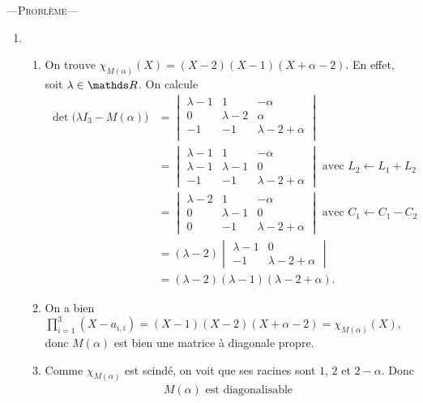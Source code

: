 \documentclass[a4paper]{article}
\begin{document}
	\begin{center}
		\LARGE ---\quad\textsc{Problème}\quad---
	\end{center}
	\begin{enumerate}
		\item
			\begin{enumerate}
				\item On trouve $\chi_{M(\alpha)}(X) = (X - 2)(X - 1)(X + \alpha - 2)$. En effet, soit $\lambda \in \R$. On calcule
					\begin{align*}
						\det\big(\lambda I_3 - M(\alpha)\big)
						&= 
						\begin{vmatrix}
							\lambda - 1 & 1 & -\alpha\\
							0 & \lambda - 2 & \alpha\\
							-1 & -1 & \lambda - 2 + \alpha\\
						\end{vmatrix}\\
						&= 
						\begin{vmatrix}
							\lambda - 1 & 1 & -\alpha\\
							\lambda - 1 & \lambda-1 & 0\\
							-1 & -1 & \lambda - 2 + \alpha
						\end{vmatrix} \text{ avec } L_2 \gets L_1 + L_2\\
						&= 
						\begin{vmatrix}
							\lambda-2 & 1 & -\alpha\\
							0 & \lambda - 1 & 0\\
							0 & -1 & \lambda - 2 + \alpha
						\end{vmatrix} \text{ avec } C_1 \gets C_1 - C_2\\
						&= (\lambda - 2)
						\begin{vmatrix}
							\lambda - 1 & 0\\
							-1 & \lambda - 2 + \alpha
						\end{vmatrix}\\
						&= (\lambda - 2)(\lambda - 1)(\lambda - 2 + \alpha).
					\end{align*}
				\item On a bien $\prod_{i=1}^3 (X-a_{i,i}) = (X-1)(X-2)(X+\alpha-2) = \chi_{M(\alpha)}(X)$, donc $M(\alpha)$\/ est bien une matrice à diagonale propre.
				\item Comme $\chi_{M(\alpha)}$\/ est scindé, on voit que ses racines sont $1$, $2$\/ et $2-\alpha$. Donc
					\begin{align*}
						M(\alpha) \text{ est diagonalisable }

\end{align*}
\end{enumerate}
\end{enumerate}
\end{document}
